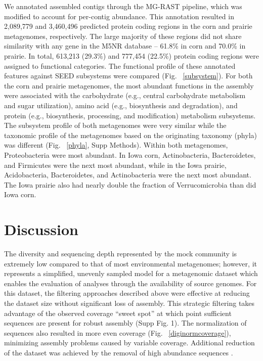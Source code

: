 \documentclass{nature}%
\begin{document}
We annotated assembled contigs through the MG-RAST pipeline, which
was modified to account for per-contig abundance.
This annotation resulted in 2,089,779 and 3,460,496 predicted protein
coding regions in the corn and prairie metagenomes, respectively.  The
large majority of these regions did not share similarity with any gene
in the M5NR database -- 61.8\% in corn and
70.0\% in prairie.  In total, 613,213 (29.3\%) and 777,454 (22.5\%)
protein coding regions were assigned to functional categories.  The
functional profile of these annotated features against SEED subsystems
were compared (Fig. ~\ref{subsystem}).  For both the corn and prairie
metagenomes, the most abundant functions in the assembly were
associated with the carbohydrate (e.g., central carbohydrate
metabolism and sugar utilization), amino acid (e.g., biosynthesis and
degradation), and protein (e.g., biosynthesis, processing, and
modification) metabolism subsystems.  The subsystem profile of both
metagenomes were very similar while the taxonomic profile of the
metagenomes based on the originating taxonomy (phyla) was different
(Fig. ~\ref{phyla}, Supp Methods).  Within both metagenomes,
Proteobacteria were most abundant.  In Iowa
corn, Actinobacteria, Bacteroidetes, and Firmicutes were
the next most abundant, while in the Iowa prairie, Acidobacteria,
Bacteroidetes, and Actinobacteria were the next most abundant.
The Iowa prairie also had nearly double the fraction
of Verrucomicrobia than did Iowa corn.


\section*{Discussion}


The diversity and sequencing depth represented by the mock community
is extremely low compared to that of most environmental metagenomes;
however, it represents a simplified, unevenly sampled model for a
metagenomic dataset which enables the evaluation of analyses through
the availability of source genomes.  For this dataset, the filtering
approaches described above were effective at reducing the dataset size
without significant loss of assembly.  This strategic filtering takes
advantage of the observed coverage ``sweet spot'' at which point
sufficient sequences are present for robust assembly (Supp Fig. 1).  
The normalization of sequences also resulted in
more even coverage (Fig. ~\ref{diginormcoverage}),
minimizing assembly problems caused by variable coverage.
Additional reduction of the dataset was achieved by the removal of
high abundance sequences \cite{howeartifacts}.
\end{document}
